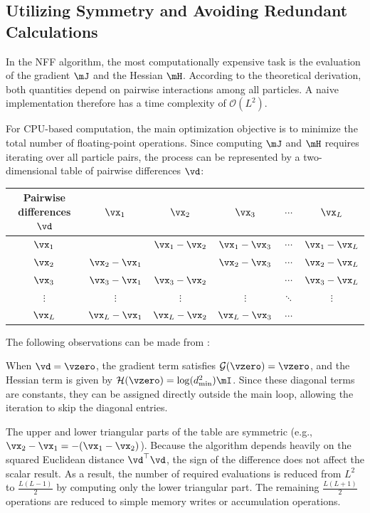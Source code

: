 \subsection{Utilizing Symmetry and Avoiding Redundant Calculations}
\label{subsec:avoiding_redundant}

In the NFF algorithm, the most computationally expensive task is the evaluation of the gradient $\mJ$ and the Hessian $\mH$. According to the theoretical derivation, both quantities depend on pairwise interactions among all particles. A naive implementation therefore has a time complexity of $\mathcal{O}(L^2)$.

For CPU-based computation, the main optimization objective is to minimize the total number of floating-point operations. Since computing $\mJ$ and $\mH$ requires iterating over all particle pairs, the process can be represented by a two-dimensional table of pairwise differences $\vd$:

\begin{Table}[ht]
	\begin{tabular}{c|ccccc}
		\hline
		Pairwise differences $\vd$ & $\vx_1$ & $\vx_2$ & $\vx_3$ & $\cdots$ & $\vx_L$ \\ \hline
		$\vx_1$ & \vzero & $\vx_1 - \vx_2$ & $\vx_1 - \vx_3$ & $\cdots$ & $\vx_1 - \vx_L$ \\
		$\vx_2$ & $\vx_2 - \vx_1$ & \vzero & $\vx_2 - \vx_3$ & $\cdots$ & $\vx_2 - \vx_L$ \\
		$\vx_3$ & $\vx_3 - \vx_1$ & $\vx_3 - \vx_2$ & \vzero & $\cdots$ & $\vx_3 - \vx_L$ \\
		$\vdots$ & $\vdots$ & $\vdots$ & $\vdots$ & $\ddots$ & $\vdots$ \\
		$\vx_L$ & $\vx_L - \vx_1$ & $\vx_L - \vx_2$ & $\vx_L - \vx_3$ & $\cdots$ & \vzero \\ \hline
	\end{tabular}
	\caption{Pairwise particle differences.}
	\label{tab:particle_diff}
\end{Table}

The following observations can be made from :

When $\vd = \vzero$, the gradient term satisfies $\mathcal{G}(\vzero) = \vzero$, and the Hessian term is given by $\mathcal{H}(\vzero) = \log(d_\text{min}^2)\mI$. Since these diagonal terms are constants, they can be assigned directly outside the main loop, allowing the iteration to skip the diagonal entries.

The upper and lower triangular parts of the table are symmetric (e.g., $\vx_2 - \vx_1 = -(\vx_1 - \vx_2)$). Because the algorithm depends heavily on the squared Euclidean distance $\vd^{\top}\vd$, the sign of the difference does not affect the scalar result. As a result, the number of required evaluations is reduced from $L^2$ to $\frac{L(L-1)}{2}$ by computing only the lower triangular part. The remaining $\frac{L(L+1)}{2}$ operations are reduced to simple memory writes or accumulation operations.

